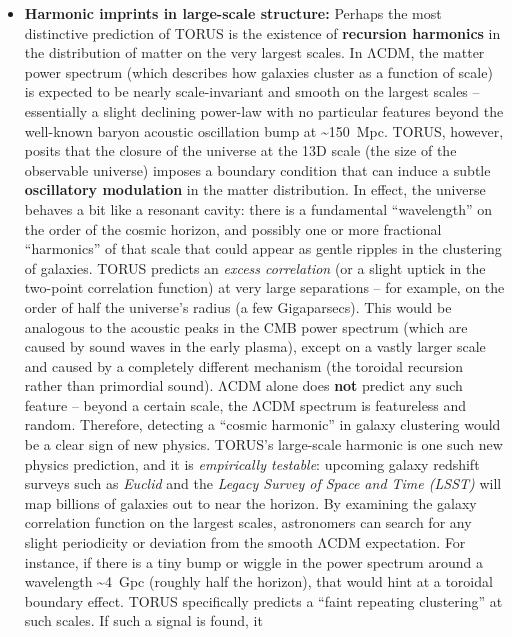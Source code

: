 \begin{itemize}
\item
  \textbf{Harmonic imprints in large-scale structure:} Perhaps the most
  distinctive prediction of TORUS is the existence of \textbf{recursion
  harmonics} in the distribution of matter on the very largest scales.
  In ΛCDM, the matter power spectrum (which describes how galaxies
  cluster as a function of scale) is expected to be nearly
  scale-invariant and smooth on the largest scales -- essentially a
  slight declining power-law with no particular features beyond the
  well-known baryon acoustic oscillation bump at
  \textasciitilde{}150~Mpc. TORUS, however, posits that the closure of
  the universe at the 13D scale (the size of the observable universe)
  imposes a boundary condition that can induce a subtle
  \textbf{oscillatory modulation} in the matter distribution​. In
  effect, the universe behaves a bit like a resonant cavity: there is a
  fundamental ``wavelength'' on the order of the cosmic horizon, and
  possibly one or more fractional ``harmonics'' of that scale that could
  appear as gentle ripples in the clustering of galaxies. TORUS predicts
  an \emph{excess correlation} (or a slight uptick in the two-point
  correlation function) at very large separations -- for example, on the
  order of half the universe's radius (a few Gigaparsecs)​. This would
  be analogous to the acoustic peaks in the CMB power spectrum (which
  are caused by sound waves in the early plasma), except on a vastly
  larger scale and caused by a completely different mechanism (the
  toroidal recursion rather than primordial sound). ΛCDM alone does
  \textbf{not} predict any such feature -- beyond a certain scale, the
  ΛCDM spectrum is featureless and random. Therefore, detecting a
  ``cosmic harmonic'' in galaxy clustering would be a clear sign of new
  physics. TORUS's large-scale harmonic is one such new physics
  prediction, and it is \emph{empirically testable}: upcoming galaxy
  redshift surveys such as \emph{Euclid} and the \emph{Legacy Survey of
  Space and Time (LSST)} will map billions of galaxies out to near the
  horizon. By examining the galaxy correlation function on the largest
  scales, astronomers can search for any slight periodicity or deviation
  from the smooth ΛCDM expectation​. For instance, if there is a tiny
  bump or wiggle in the power spectrum around a wavelength
  \textasciitilde{}4~Gpc (roughly half the horizon), that would hint at
  a toroidal boundary effect​. TORUS specifically predicts a ``faint
  repeating clustering'' at such scales​. If such a signal is found, it

\end{itemize}
